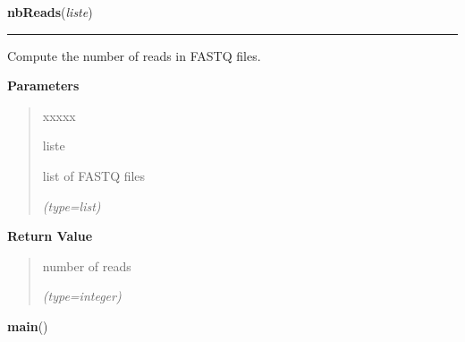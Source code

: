 \hspace{.8\funcindent}\begin{boxedminipage}{\funcwidth}

    \raggedright \textbf{nbReads}(\textit{liste})

    \vspace{-1.5ex}

    \rule{\textwidth}{0.5\fboxrule}
\setlength{\parskip}{2ex}
    Compute the number of reads in FASTQ files.

\setlength{\parskip}{1ex}
      \textbf{Parameters}
      \vspace{-1ex}

      \begin{quote}
        \begin{Ventry}{xxxxx}

          \item[liste]

          list of FASTQ files

            {\it (type=list)}

        \end{Ventry}

      \end{quote}

      \textbf{Return Value}
    \vspace{-1ex}

      \begin{quote}
      number of reads

      {\it (type=integer)}

      \end{quote}

    \end{boxedminipage}

    \label{script-BAMmaker:main}

    \vspace{0.5ex}

\hspace{.8\funcindent}\begin{boxedminipage}{\funcwidth}

    \raggedright \textbf{main}()

\setlength{\parskip}{2ex}
\setlength{\parskip}{1ex}
    \end{boxedminipage}



